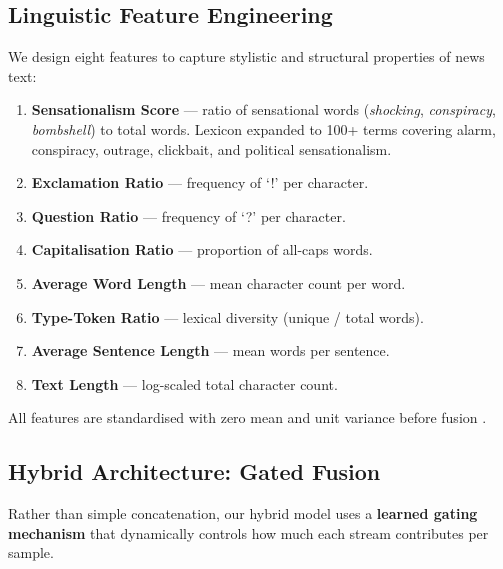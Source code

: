 \documentclass[10pt,twoside]{article}
\begin{document}
\subsection{Linguistic Feature Engineering}

We design eight features to capture stylistic and structural
properties of news text:

\begin{enumerate}[leftmargin=*,itemsep=1pt,topsep=2pt]
  \item \textbf{Sensationalism Score} --- ratio of sensational
        words (\emph{shocking}, \emph{conspiracy},
        \emph{bombshell}) to total words. Lexicon expanded to
        100+ terms covering alarm, conspiracy, outrage,
        clickbait, and political sensationalism.
  \item \textbf{Exclamation Ratio} --- frequency of `!'
        per character.
  \item \textbf{Question Ratio} --- frequency of `?'
        per character.
  \item \textbf{Capitalisation Ratio} --- proportion of
        all-caps words.
  \item \textbf{Average Word Length} --- mean character count
        per word.
  \item \textbf{Type-Token Ratio} --- lexical diversity
        (unique / total words).
  \item \textbf{Average Sentence Length} --- mean words per
        sentence.
  \item \textbf{Text Length} --- log-scaled total character
        count.
\end{enumerate}

All features are standardised with zero mean and unit
variance before fusion \citep{rashkin2017truth}.

\subsection{Hybrid Architecture: Gated Fusion}

Rather than simple concatenation, our hybrid model uses a
\textbf{learned gating mechanism} that dynamically controls
how much each stream contributes per sample.
\end{document}
